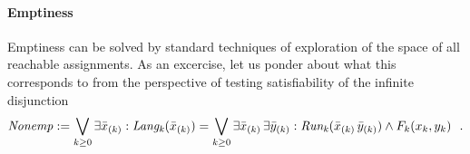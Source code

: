 \documentclass[10pt]{llncs}
\newcommand{\Nonempty}{\mathit{Nonemp}}
\newcommand{\Language}[1]{\mathit{Lang_{#1}}}
\newcommand{\Run}[1]{\mathit{Run_{#1}}}
\newcommand{\initial}{I}
\newcommand{\final}{F}
\newcommand{\fdef}{\mathrel{:=}}
\begin{document}
\paragraph{Emptiness}
Emptiness can be solved by standard techniques of exploration of the space of all reachable assignments. As an excercise, let us ponder about what this corresponds to from the perspective of testing satisfiability of the infinite disjunction 
$$
\Nonempty \fdef
\bigvee_{k\geq 0} \exists \vect x[k]:\Language k(\vect x[k])
=
\bigvee_{k\geq 0} \exists \vect x[k]\,\exists \vect y[k]:\Run k(\vect x[k]\,\vect y[k]) \land \final_k(x_{k},y_k)\ \ . 
$$
\end{document}
